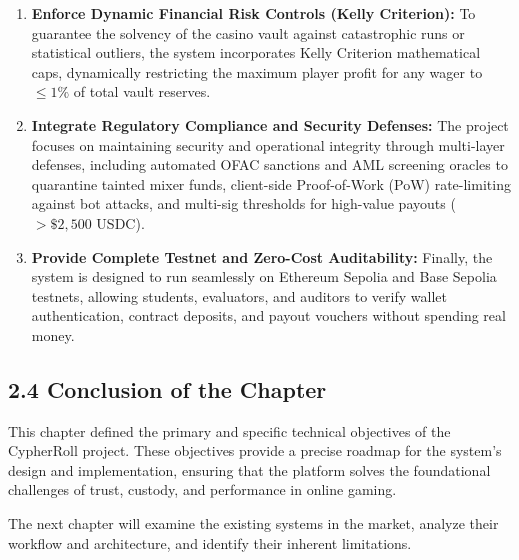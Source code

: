 \begin{enumerate}[leftmargin=1.5em]
    \item \textbf{Enforce Dynamic Financial Risk Controls (Kelly Criterion):} To guarantee the solvency of the casino vault against catastrophic runs or statistical outliers, the system incorporates Kelly Criterion mathematical caps, dynamically restricting the maximum player profit for any wager to $\le 1\%$ of total vault reserves.
    
    \item \textbf{Integrate Regulatory Compliance and Security Defenses:} The project focuses on maintaining security and operational integrity through multi-layer defenses, including automated OFAC sanctions and AML screening oracles to quarantine tainted mixer funds, client-side Proof-of-Work (PoW) rate-limiting against bot attacks, and multi-sig thresholds for high-value payouts ($> \$2,500$ USDC).
    
    \item \textbf{Provide Complete Testnet and Zero-Cost Auditability:} Finally, the system is designed to run seamlessly on Ethereum Sepolia and Base Sepolia testnets, allowing students, evaluators, and auditors to verify wallet authentication, contract deposits, and payout vouchers without spending real money.
\end{enumerate}

\subsection*{2.4 Conclusion of the Chapter}
This chapter defined the primary and specific technical objectives of the CypherRoll project. These objectives provide a precise roadmap for the system's design and implementation, ensuring that the platform solves the foundational challenges of trust, custody, and performance in online gaming.

The next chapter will examine the existing systems in the market, analyze their workflow and architecture, and identify their inherent limitations.
\label{chap:objectives_end}
